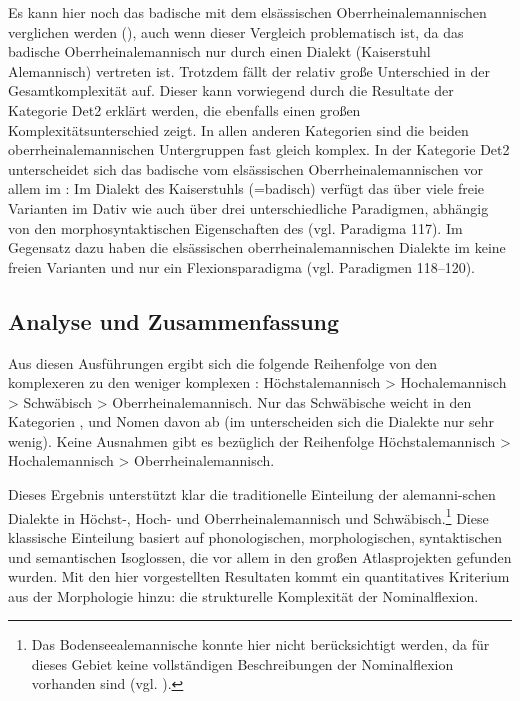 Es kann hier noch das badische mit dem elsässischen Oberrheinalemannischen verglichen werden (), auch wenn dieser Vergleich problematisch ist, da das badische Oberrheinalemannisch nur durch einen Dialekt (Kaiserstuhl Alemannisch) vertreten ist. Trotzdem fällt der relativ große Unterschied in der Gesamtkomplexität auf. Dieser kann vorwiegend durch die Resultate der Kategorie Det2 erklärt werden, die ebenfalls einen großen Komplexitätsunterschied zeigt. In allen anderen Kategorien sind die beiden oberrheinalemannischen Untergruppen fast gleich komplex. In der Kategorie Det2 unterscheidet sich das badische vom elsässischen Oberrheinalemannischen vor allem im : Im Dialekt des Kaiserstuhls (=badisch) verfügt das  über viele freie Varianten im Dativ wie auch über drei unterschiedliche Paradigmen, abhängig von den morphosyntaktischen Eigenschaften des  (vgl. Paradigma 117). Im Gegensatz dazu haben die elsässischen oberrheinalemannischen Dialekte im  keine freien Varianten und nur ein Flexionsparadigma (vgl. Paradigmen 118–120).

\subsection{Analyse und Zusammenfassung}\label{6.2.2}

Aus diesen Ausführungen ergibt sich die folgende Reihenfolge von den komplexeren zu den weniger komplexen : Höchstalemannisch > Hochalemannisch > Schwäbisch > Oberrheinalemannisch. Nur das Schwäbische weicht in den Kategorien ,  und Nomen davon ab (im  unterscheiden sich die Dialekte nur sehr wenig). Keine Ausnahmen gibt es bezüglich der Reihenfolge Höchstalemannisch > Hochalemannisch > Oberrheinalemannisch.

Dieses Ergebnis unterstützt klar die traditionelle Einteilung der alemanni-\linebreak schen Dialekte in Höchst-, Hoch- und Oberrheinalemannisch und Schwäbisch.\footnote{Das Bodenseealemannische konnte hier nicht berücksichtigt werden, da für dieses Gebiet keine vollständigen Beschreibungen der Nominalflexion vorhanden sind (vgl. ).} Diese klassische Einteilung basiert auf phonologischen, morphologischen, syntaktischen und semantischen Isoglossen, die vor allem in den großen Atlasprojekten gefunden wurden. Mit den hier vorgestellten Resultaten kommt ein quantitatives Kriterium aus der Morphologie hinzu: die strukturelle Komplexität der Nominalflexion.

